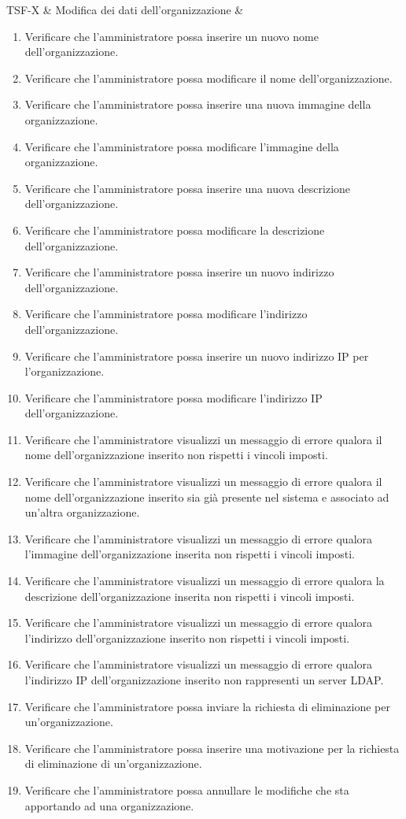 TSF-X & Modifica dei dati dell'organizzazione & \begin{enumerate}
\item Verificare che l'amministratore possa inserire un nuovo nome dell'organizzazione.
\item Verificare che l'amministratore possa modificare il nome dell'organizzazione.
\item Verificare che l'amministratore possa inserire una nuova immagine della organizzazione.
\item Verificare che l'amministratore possa modificare l'immagine della organizzazione.
\item Verificare che l'amministratore possa inserire una nuova descrizione dell’organizzazione.
\item Verificare che l'amministratore possa modificare la descrizione dell’organizzazione.
\item Verificare che l'amministratore possa inserire un nuovo indirizzo dell’organizzazione.
\item Verificare che l'amministratore possa modificare l'indirizzo dell’organizzazione.
\item Verificare che l'amministratore possa inserire un nuovo indirizzo IP per l'organizzazione.
\item Verificare che l'amministratore possa modificare l'indirizzo IP dell'organizzazione.
\item Verificare che l'amministratore visualizzi un messaggio di errore qualora il nome dell'organizzazione inserito non rispetti i vincoli imposti.
\item Verificare che l'amministratore visualizzi un messaggio di errore qualora il nome dell'organizzazione inserito sia già presente nel sistema e associato ad un'altra organizzazione.
\item Verificare che l'amministratore visualizzi un messaggio di errore qualora l'immagine dell'organizzazione inserita non rispetti i vincoli imposti.
\item Verificare che l'amministratore visualizzi un messaggio di errore qualora la descrizione dell'organizzazione inserita non rispetti i vincoli imposti.
\item Verificare che l'amministratore visualizzi un messaggio di errore qualora l'indirizzo dell'organizzazione inserito non rispetti i vincoli imposti.
\item Verificare che l'amministratore visualizzi un messaggio di errore qualora l'indirizzo IP dell'organizzazione inserito non rappresenti un server LDAP.
\item Verificare che l'amministratore possa inviare la richiesta di eliminazione per un'organizzazione.
\item Verificare che l'amministratore possa inserire una motivazione per la richiesta di eliminazione di un'organizzazione.
\item Verificare che l'amministratore possa annullare le modifiche che sta apportando ad una organizzazione.
\end{enumerate}
